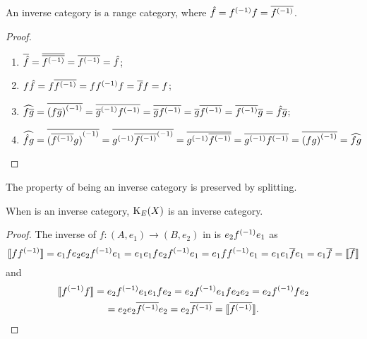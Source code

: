 \begin{lemma}\label{lem:inverse_categories_are_range_categories}
  An inverse category \X is a range category, where $\hat{f} = {f}^{(-1)}f = \overline{{f}^{(-1)}}$.
\end{lemma}
\begin{proof}
  \prepprooflist
  \begin{enumerate}
    \item[\rrone] $\overline{\hat{f}} = \overline{\overline{{f}^{(-1)}}} = \overline{{f}^{(-1)}} = \hat{f}$;
    \item[\rrtwo] $f \hat{f} = f \overline{{f}^{(-1)}} = f {f}^{(-1)} f = \overline{f} f = f$;
    \item[\rrthree] $\widehat{f\overline{g}} = \overline{{(f\overline{g})}^{(-1)}} = \overline{{\overline{g}}^{(-1)} {f}^{(-1)}} =
      \overline{\overline{g} {f}^{(-1)}} =
      \overline{g} \overline{{f}^{(-1)}} = \overline{{f}^{(-1)}} \overline{g} =\hat{f} \overline{g}$;
    \item[\rrfour]  $\widehat{\hat{f}g} = \overline{{(\overline{{f}^{(-1)}} g)}^{(-1)}} =
      \overline{{g}^{(-1)}{\overline{{f}^{(-1)}}}^{(-1)}} = \overline{{g}^{(-1)} \overline{{f}^{(-1)}}} =
      \overline{{g}^{(-1)} {f}^{(-1)}} = \overline{{(f g)}^{(-1)}} = \widehat{f g}$
  \end{enumerate}
\end{proof}

The property of being an inverse category is
preserved by splitting.

\begin{lemma}\label{lem:the_idempotent_splitting_of_an_inverse_category_is_an_inverse_category}
  When \X is an inverse category, $\text{K}_{E}(X)$ is an inverse category.
\end{lemma}
\begin{proof}
  The inverse of $f:(A,e_1)\to(B,e_2)$   in  is $e_2{f}^{(-1)}e_1$ as
  \[
    \llbracket f {f}^{(-1)} \rrbracket = e_1 f e_2 e_2 {f}^{(-1)} e_1
    = e_1 e_1 f e_2 {f}^{(-1)} e_1
    = e_1 f  {f}^{(-1)} e_1
    = e_1 e_1 \overline{f} e_1
    = e_1 \overline{f}
    = \llbracket\overline{f}\rrbracket
  \]
  and
  \begin{multline*}
    \llbracket {f}^{(-1)} f\rrbracket=
    e_2 {f}^{(-1)} e_1 e_1 f e_2
    = e_2 {f}^{(-1)} e_1 f e_2 e_2
    = e_2 {f}^{(-1)} f  e_2\\
    = e_2 e_2 \overline{{f}^{(-1)}}  e_2
    = e_2 \overline{{f}^{(-1)}}
    = \llbracket\overline{{f}^{(-1)}}\rrbracket.
  \end{multline*}

\end{proof}

